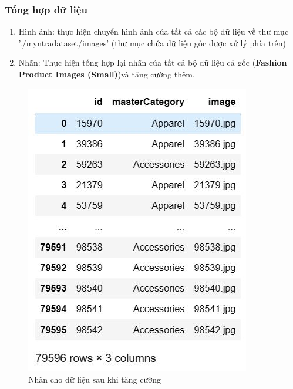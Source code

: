 \subsubsection{Tổng hợp dữ liệu}
\begin{enumerate}
    \item Hình ảnh: thực hiện chuyển hình ảnh của tất cả các bộ dữ liệu về thư mục './myntradataset/images' (thư mục chứa dữ liệu gốc được xử lý phía trên)

    \item Nhãn: Thực hiện tổng hợp lại nhãn của tất cả bộ dữ liệu cả gốc (\textbf{Fashion Product Images (Small)})và tăng cường thêm.
\end{enumerate}

\begin{center}
    \begin{figure}[!h]
        \centering
        \includegraphics[scale = 1.4]{fileanh/49.jpg}
        \caption{Nhãn cho dữ liệu sau khi tăng cường}
    \end{figure}
\end{center}

